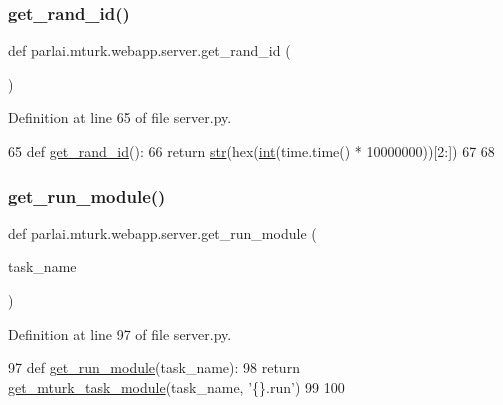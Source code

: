 \subsubsection{\texorpdfstring{get\+\_\+rand\+\_\+id()}{get\_rand\_id()}}
{\footnotesize\ttfamily def parlai.\+mturk.\+webapp.\+server.\+get\+\_\+rand\+\_\+id (\begin{DoxyParamCaption}{ }\end{DoxyParamCaption})}



Definition at line 65 of file server.\+py.


\begin{DoxyCode}
65 \textcolor{keyword}{def }\hyperlink{namespaceparlai_1_1mturk_1_1webapp_1_1server_a762795ce59d6dbcb111fd9162a870f9f}{get\_rand\_id}():
66     \textcolor{keywordflow}{return} \hyperlink{namespacegenerate__task__READMEs_a5b88452ffb87b78c8c85ececebafc09f}{str}(hex(\hyperlink{namespacelanguage__model_1_1eval__ppl_a7d12ee00479673c5c8d1f6d01faa272a}{int}(time.time() * 10000000))[2:])
67 
68 
\end{DoxyCode}
\mbox{\label{namespaceparlai_1_1mturk_1_1webapp_1_1server_a49eb9835228f9f47f9aa55bc6369c23f}} 
\subsubsection{\texorpdfstring{get\+\_\+run\+\_\+module()}{get\_run\_module()}}
{\footnotesize\ttfamily def parlai.\+mturk.\+webapp.\+server.\+get\+\_\+run\+\_\+module (\begin{DoxyParamCaption}\item[{}]{task\+\_\+name }\end{DoxyParamCaption})}



Definition at line 97 of file server.\+py.


\begin{DoxyCode}
97 \textcolor{keyword}{def }\hyperlink{namespaceparlai_1_1mturk_1_1webapp_1_1server_a49eb9835228f9f47f9aa55bc6369c23f}{get\_run\_module}(task\_name):
98     \textcolor{keywordflow}{return} \hyperlink{namespaceparlai_1_1mturk_1_1webapp_1_1server_a0c7e088cb9401f94297c2ae96dce3ec2}{get\_mturk\_task\_module}(task\_name, \textcolor{stringliteral}{'\{\}.run'})
99 
100 
\end{DoxyCode}
\mbox{\label{namespaceparlai_1_1mturk_1_1webapp_1_1server_a1919be0d74781c0b9f579daf974d9f53}} 
